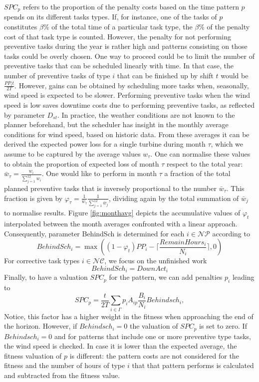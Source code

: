 $SPC_p$ refers to the proportion of the penalty costs based on the time pattern $p$ spends on its different tasks types. If, for instance, one of the tasks of $p$ constitutes $\beta$\% of the total time of a particular task type, the $\beta$\% of the penalty cost of that task type is counted. However, the penalty for not performing preventive tasks during the year is rather high and patterns consisting on those tasks could be overly chosen. One way to proceed could be to limit the number of  preventive tasks that can be scheduled linearly with time.  In that case, the number of preventive tasks of type $i$ that can be finished up by shift $t$ would be $ \frac{PP_it}{2T}$. However, gains can be obtained by scheduling more tasks when, seasonally, wind speed is expected to be slower. Performing preventive tasks when the wind speed is low saves downtime costs due to performing preventive tasks, as reflected by parameter $D_{st}$.
In practice, the weather conditions are not known to the planner beforehand, but the scheduler has insight in the monthly average conditions for wind speed, based on historic data. From these averages it can be derived the expected power loss for a single turbine during month $\tau$, which we assume to be captured by the average values $w_\tau$. One can normalise these values to obtain the proportion of expected loss of month $\tau$ respect to the total year: $\bar{w}_\tau=\frac{w_i}{\sum_{j=1}^{12}w_i}$. One would like to perform in month $\tau$ a fraction of the total planned preventive tasks that is inversely proportional to the number $\bar{w}_\tau$. This fraction is given by $\varphi_{\tau}=\frac{1}{\bar{w}_\tau}\frac{1}{\sum_{j=1}^{12}\bar{w}_j}$, dividing again by the total summation of $\bar{w}_j$ to normalise results.
%
Figure \ref{fig:monthavg} depicts the accumulative values of $\varphi_{t}$ interpolated between the month averages confronted with a linear approach.
%
Consequently, parameter BehindSch is determined for each $i\in \mathcal{NP}$ according to
$$BehindSch_{i}=\max((1-\varphi_{t})PP_i -\lceil \frac{RemainHours_i}{N_i}\rceil,0)$$
%
For corrective task types $i\in \mathcal{NC}$, we focus on the unfinished work
%
$$BehindSch_{i}= DownAct_i$$
%
Finally, to have a valuation $S{PC}_p$ for the pattern, we can add penalties $p_i$ leading to
%
$$SPC_p= \frac{t}{2T}\sum_{i \in \Gamma}p_iA_{ip}\frac{B_i}{N_i}Behindsch_i ,$$
%
Notice, this factor has a higher weight in the fitness when approaching the end of the horizon. However, if $Behindsch_i=0$ the valuation of $S{PC}_p$ is set to zero. If $Behindsch_i=0$ and for patterns that include one or more preventive type tasks, the wind speed is checked. In case it is lower than the expected average, the fitness valuation of $p$ is different: the pattern costs are not considered for the fitness and the number of hours of type $i$ that that pattern performs is calculated and subtracted from the fitness value.


